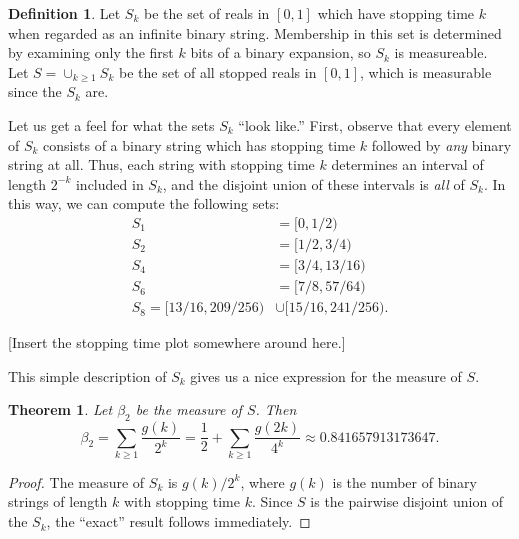 \documentclass[12pt]{amsart}
\newtheorem{theorem}{Theorem}
\theoremstyle{definition}
\newtheorem{definition}{Definition}
\begin{document}
\begin{definition}
    Let $S_k$ be the set of reals in $[0, 1]$ which have stopping time $k$ when
    regarded as an infinite binary string. Membership in this set is determined
    by examining only the first $k$ bits of a binary expansion, so $S_k$ is
    measureable. Let $S = \cup_{k \geq 1} S_k$ be the set of all stopped reals
    in $[0, 1]$, which is measurable since the $S_k$ are.
\end{definition}

Let us get a feel for what the sets $S_k$ ``look like.'' First, observe that
every element of $S_k$ consists of a binary string which has stopping time $k$
followed by \emph{any} binary string at all. Thus, each string with stopping
time $k$ determines an interval of length $2^{-k}$ included in $S_k$, and the
disjoint union of these intervals is \emph{all} of $S_k$. In this way, we can
compute the following sets:
\begin{align*}
    S_1 &= [0, 1/2) \\
    S_2 &= [1/2, 3/4) \\
    S_4 &= [3/4, 13/16) \\
    S_6 &= [7/8, 57/64) \\
    S_8 = [13/16, 209/256) &\cup [15/16, 241/256).
\end{align*}

[Insert the stopping time plot somewhere around here.]

This simple description of $S_k$ gives us a nice expression for the measure of
$S$.

\begin{theorem}
    Let $\beta_2$ be the measure of $S$. Then
    \begin{equation*}
        \beta_2 = \sum_{k \geq 1} \frac{g(k)}{2^k} = \frac{1}{2} + \sum_{k \geq 1} \frac{g(2k)}{4^k}
        \approx 0.841657913173647.
    \end{equation*}
\end{theorem}

\begin{proof}
    The measure of $S_k$ is $g(k) / 2^k$, where $g(k)$ is the number of binary
    strings of length $k$ with stopping time $k$. Since $S$ is the pairwise
    disjoint union of the $S_k$, the ``exact'' result follows immediately.
\end{proof}
\end{document}
